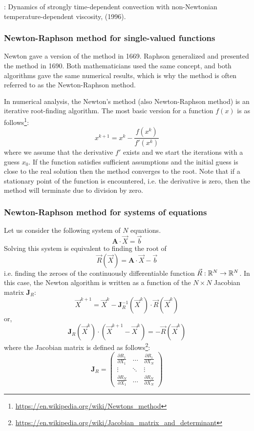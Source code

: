 \Literature: Dynamics of strongly time-dependent convection
with non-Newtonian temperature-dependent viscosity, \textcite{laym96} (1996).

\subsubsection*{Newton-Raphson method for single-valued functions}

Newton gave a version of the method in 1669. Raphson generalized and presented
the method in 1690. Both mathematicians used the same concept, and both algorithms gave the
same numerical results, which is why the method is often referred to as the Newton-Raphson method.

In numerical analysis, the Newton's method (also Newton-Raphson method) 
is an iterative root-finding algorithm.
The most basic version for a function $f(x)$ is as 
follows\footnote{\url{https://en.wikipedia.org/wiki/Newtons_method}}:
\[
x^{k+1} = x^k - \frac{f(x^k)}{f'(x^k)}
\]
where we assume that the derivative $f'$ exists and we start the iterations 
with a guess $x_0$.
If the function satisfies sufficient assumptions and the initial guess is close
to the real solution then the method converges to the root. 
Note that if a stationary point of the function is encountered, i.e. 
the derivative is zero, then the method will terminate due to division by zero. 

\subsubsection*{Newton-Raphson method for systems of equations}
Let us consider the following system of $N$ equations. 
\[
{\bm A} \cdot \vec{X} = \vec{b}
\]
Solving this system is equivalent to finding the root of 
\[
\vec{R}(\vec{X}) =  {\bm A} \cdot \vec{X} - \vec{b}
\]
i.e. finding the zeroes of the continuously differentiable function $\vec{R}: {\mathbb{R}}^N \rightarrow {\mathbb{R}}^N$. 
In this case, the Newton algorithm is written as a function of the $N\times N$ Jacobian 
matrix ${\bm J}_R$:
\begin{equation}
\vec{X}^{k+1} = \vec{X}^k - {\bm J}_R^{-1}(\vec{X}^k) \cdot {\vec R}(\vec{X}^k)
\end{equation}
or,
\begin{equation}
{\bm J}_R (\vec{X}^k) \cdot( \vec{X}^{k+1} - \vec{X}^k  )   = - \vec{R}(\vec{X}^k)
\label{eq:f87newt}
\end{equation}
where the Jacobian matrix is defined as 
follows\footnote{\url{https://en.wikipedia.org/wiki/Jacobian_matrix_and_determinant}}:
\[
{\bm J}_R = 
\left(
\begin{array}{ccc}
\frac{\partial R_1}{\partial X_1} & \dots & \frac{\partial R_1}{\partial X_N} \\
\vdots & \ddots & \vdots \\ 
\frac{\partial R_N}{\partial X_1} & \dots & \frac{\partial R_N}{\partial X_N} 
\end{array}
\right)
\]


